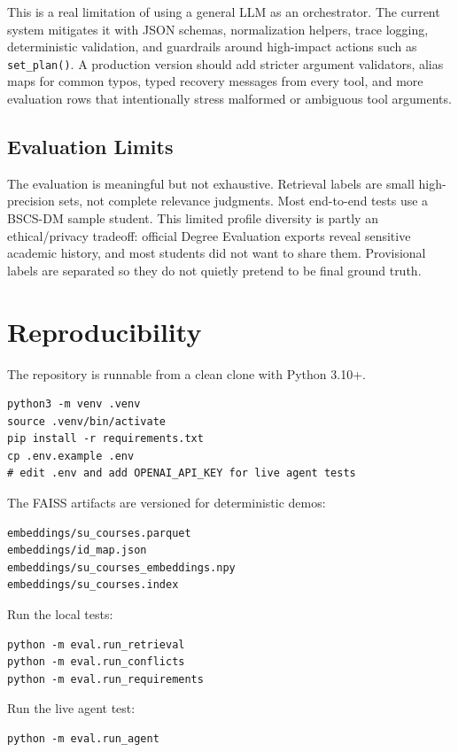 \documentclass[10pt,letterpaper]{article}
\newcommand{\code}[1]{\texttt{#1}}
\begin{document}
This is a real limitation of using a general LLM as an orchestrator. The current system mitigates it with JSON schemas, normalization helpers, trace logging, deterministic validation, and guardrails around high-impact actions such as \code{set\_plan()}. A production version should add stricter argument validators, alias maps for common typos, typed recovery messages from every tool, and more evaluation rows that intentionally stress malformed or ambiguous tool arguments.

\subsection{Evaluation Limits}
The evaluation is meaningful but not exhaustive. Retrieval labels are small high-precision sets, not complete relevance judgments. Most end-to-end tests use a BSCS-DM sample student. This limited profile diversity is partly an ethical/privacy tradeoff: official Degree Evaluation exports reveal sensitive academic history, and most students did not want to share them. Provisional labels are separated so they do not quietly pretend to be final ground truth.

\section{Reproducibility}

The repository is runnable from a clean clone with Python 3.10+.

\begin{lstlisting}
python3 -m venv .venv
source .venv/bin/activate
pip install -r requirements.txt
cp .env.example .env
# edit .env and add OPENAI_API_KEY for live agent tests
\end{lstlisting}

The FAISS artifacts are versioned for deterministic demos:

\begin{lstlisting}
embeddings/su_courses.parquet
embeddings/id_map.json
embeddings/su_courses_embeddings.npy
embeddings/su_courses.index
\end{lstlisting}

Run the local tests:
\begin{lstlisting}
python -m eval.run_retrieval
python -m eval.run_conflicts
python -m eval.run_requirements
\end{lstlisting}

Run the live agent test:
\begin{lstlisting}
python -m eval.run_agent
\end{lstlisting}
\end{document}
